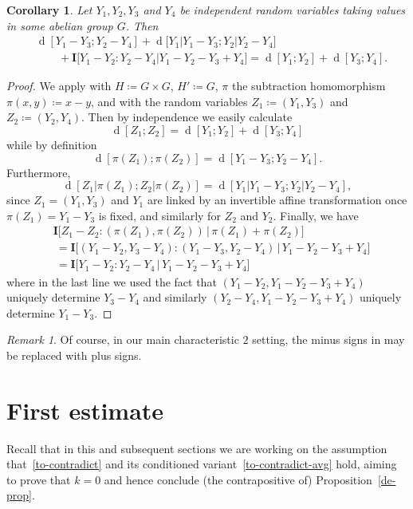 \documentclass[12pt,reqno,tbtags]{amsart}
\newtheorem{corollary}[theorem]{Corollary}
\theoremstyle{definition}
\theoremstyle{remark}
\newtheorem{remark}[theorem]{Remark}
\newcommand{\bigI}[1]{\mathbf{I}\big[#1\big]}
\newcommand{\dist}[2]{{\operatorname{d}[#1;#2]}} %
\newcommand{\bigdist}[2]{{\operatorname{d}\bigl[#1;#2\bigr]}} %
\numberwithin{equation}{section}
\begin{document}
\begin{corollary}\label{cor-fibre}
   Let $Y_1,Y_2,Y_3$ and $Y_4$ be independent random variables taking values in some abelian group $G$.
  Then
\begin{align*}
 \nonumber
  & \dist{Y_1-Y_3}{Y_2-Y_4} + \bigdist{Y_1|Y_1-Y_3}{Y_2|Y_2-Y_4} \\
  &\qquad + \bigI{ Y_1-Y_2 : Y_2 - Y_4 | Y_1-Y_2-Y_3+Y_4 } = \dist{Y_1}{Y_2} + \dist{Y_3}{Y_4}.
\end{align*}
\end{corollary}
\begin{proof}  We apply  with $H \coloneqq G \times G$, $H' \coloneqq G$, $\pi$ the subtraction homomorphism $\pi(x,y) \coloneqq x-y$, and with the random variables $Z_1 \coloneqq (Y_1,Y_3)$ and $Z_2 \coloneqq (Y_2,Y_4)$. Then by independence we easily calculate
\[
  \dist{Z_1}{Z_2} = \dist{Y_1}{Y_2} + \dist{Y_3}{Y_4}
\]
while by definition
\[
  \dist{\pi(Z_1)}{\pi(Z_2)} = \dist{Y_1-Y_3}{Y_2-Y_4}.
\]
Furthermore,
\[
  \dist{Z_1|\pi(Z_1)}{Z_2|\pi(Z_2)} = \dist{Y_1|Y_1-Y_3}{Y_2|Y_2-Y_4},
\]
since $Z_1=(Y_1,Y_3)$ and $Y_1$ are linked by an invertible affine transformation once $\pi(Z_1)=Y_1-Y_3$ is fixed, and similarly for $Z_2$ and $Y_2$.
Finally, we have
\begin{align*}
  &\bigI{Z_1 - Z_2 : (\pi(Z_1),\pi(Z_2)) \,|\, \pi(Z_1) + \pi(Z_2)} \\
  &\ = \bigI{(Y_1-Y_2, Y_3-Y_4) : (Y_1-Y_3, Y_2-Y_4) \,|\, Y_1-Y_2-Y_3+Y_4} \\
  &\ = \bigI{Y_1-Y_2 : Y_2-Y_4 \,|\, Y_1-Y_2-Y_3+Y_4}
\end{align*}
where in the last line we used the fact that $(Y_1-Y_2, Y_1-Y_2-Y_3+Y_4)$ uniquely determine $Y_3-Y_4$ and similarly
$(Y_2-Y_4, Y_1-Y_2-Y_3+Y_4)$ uniquely determine $Y_1-Y_3$.
\end{proof}
\begin{remark}\label{rem:char2}
  Of course, in our main characteristic $2$ setting, the minus signs in  may be replaced with plus signs. \end{remark}

\section{First estimate}\label{first}

Recall that in this and subsequent sections we are working on the assumption that~\eqref{to-contradict} and its conditioned variant~\eqref{to-contradict-avg} hold, aiming to prove that $k = 0$ and hence conclude (the contrapositive of) Proposition~\ref{de-prop}.
\end{document}

